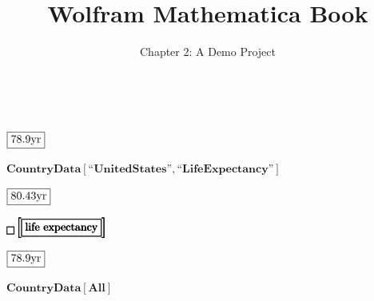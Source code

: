 \documentclass{article}
\begin{document}
\title{Wolfram Mathematica Book}
\author{Chapter 2: A Demo Project}
\date{}
\maketitle

\(\)

\begin{doublespace}
\noindent\(\fbox{$78.9\text{yr}$}\)
\end{doublespace}

\begin{doublespace}
\noindent\(\pmb{\text{CountryData}[\text{{``}UnitedStates{''}},\text{{``}LifeExpectancy{''}}]}\)
\end{doublespace}

\begin{doublespace}
\noindent\(\fbox{$80.43\text{yr}$}\)
\end{doublespace}

\begin{doublespace}
\noindent\(\pmb{\fbox{$$}\left[\fbox{$\text{life expectancy}$}\right]}\)
\end{doublespace}

\begin{doublespace}
\noindent\(\fbox{$78.9\text{yr}$}\)
\end{doublespace}

\begin{doublespace}
\noindent\(\pmb{\text{CountryData}[\text{All}]}\)
\end{doublespace}
\end{document}
